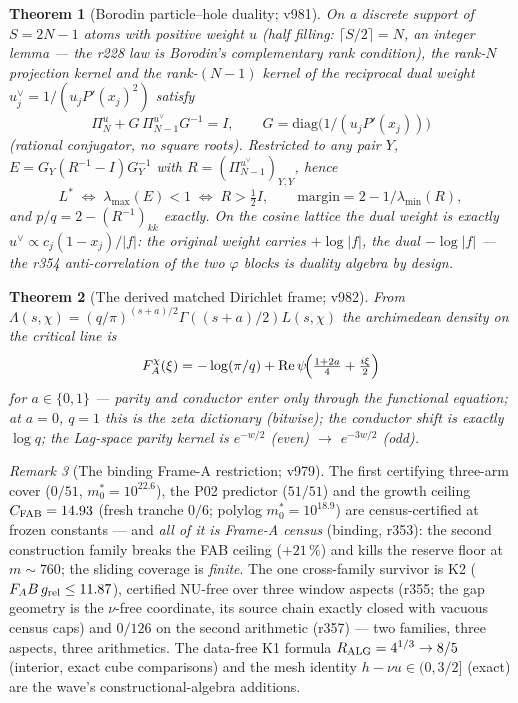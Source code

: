 \documentclass[11pt]{article}
\newtheorem{theorem}{Theorem}[section]
\theoremstyle{definition}
\theoremstyle{remark}
\newtheorem{remark}[theorem]{Remark}
\begin{document}
\begin{theorem}[Borodin particle--hole duality; v981]\label{thm:borodin}
On a discrete support of $S = 2N-1$ atoms with positive weight $u$
(half filling: $\lceil S/2\rceil = N$, an integer lemma --- the r228
law \emph{is} Borodin's complementary rank condition), the rank-$N$
projection kernel and the rank-$(N{-}1)$ kernel of the reciprocal dual
weight $u^\vee_j = 1/(u_j P'(x_j)^2)$ satisfy
\[
\Pi_N^u + G\,\Pi_{N-1}^{u^\vee} G^{-1} = I, \qquad
G = \mathrm{diag}\bigl(1/(u_j P'(x_j))\bigr)
\]
(rational conjugator, no square roots).  Restricted to any pair $Y$,
$E = G_Y (R^{-1} - I) G_Y^{-1}$ with $R = (\Pi_{N-1}^{u^\vee})_{Y,Y}$,
hence
\[
L^* \;\Longleftrightarrow\; \lambda_{\max}(E) < 1
\;\Longleftrightarrow\; R > \tfrac12 I, \qquad
\text{margin} = 2 - 1/\lambda_{\min}(R),
\]
and $p/q = 2 - (R^{-1})_{kk}$ exactly.  On the cosine lattice the dual
weight is exactly $u^\vee \propto c_j (1 - x_j)/|f|$: the original
weight carries $+\log|f|$, the dual $-\log|f|$ --- \emph{the r354
anti-correlation of the two $\varphi$ blocks is duality algebra by
design}.
\end{theorem}

\begin{theorem}[The derived matched Dirichlet frame; v982]
\label{thm:matched-frame}
From $\Lambda(s,\chi) = (q/\pi)^{(s+a)/2}\Gamma((s+a)/2)L(s,\chi)$ the
archimedean density on the critical line is
\[
F_A^\chi(\xi) = -\log(\pi/q) + \mathrm{Re}\,
\psi\!\Bigl(\tfrac{1+2a}{4} + \tfrac{i\xi}{2}\Bigr)
\]
for $a \in \{0, 1\}$ --- parity and conductor enter only through the
functional equation; at $a = 0$, $q = 1$ this \emph{is} the zeta
dictionary (bitwise); the conductor shift is exactly $\log q$; the
Lag-space parity kernel is $e^{-w/2}$ (even) $\to$ $e^{-3w/2}$ (odd).
\end{theorem}

\begin{remark}[The binding Frame-A restriction; v979]
\label{rem:frameA}
The first certifying three-arm cover ($0/51$, $m_0^* = 10^{22.6}$),
the P02 predictor ($51/51$) and the growth ceiling $C_{\rm FAB} =
14.93$ (fresh tranche $0/6$; polylog $m_0^* = 10^{18.9}$) are
census-certified at frozen constants --- and \emph{all of it is
Frame-A census} (binding, r353): the second construction family
breaks the FAB ceiling ($+21\,\%$) and kills the reserve floor at
$m \sim 760$; the sliding coverage is \emph{finite}.  The one
cross-family survivor is K2 ($F_A B\,g_{\rm rel} \le 11.87$),
certified NU-free over three window aspects (r355; the gap geometry
is the $\nu$-free coordinate, its source chain exactly closed with
vacuous census caps) and $0/126$ on the second arithmetic (r357) ---
two families, three aspects, three arithmetics.  The data-free K1
formula $R_{\rm ALG} = 4^{1/3} \to 8/5$ (interior, exact cube
comparisons) and the mesh identity $h - \nu u \in (0, 3/2]$ (exact)
are the wave's constructional-algebra additions.
\end{remark}
\end{document}
